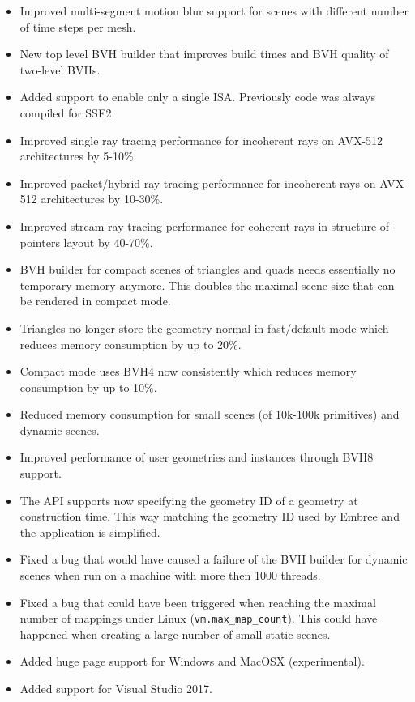 \begin{itemize}
\tightlist
\item
  Improved multi-segment motion blur support for scenes with different
  number of time steps per mesh.
\item
  New top level BVH builder that improves build times and BVH quality of
  two-level BVHs.
\item
  Added support to enable only a single ISA. Previously code was always
  compiled for SSE2.
\item
  Improved single ray tracing performance for incoherent rays on AVX-512
  architectures by 5-10\%.
\item
  Improved packet/hybrid ray tracing performance for incoherent rays on
  AVX-512 architectures by 10-30\%.
\item
  Improved stream ray tracing performance for coherent rays in
  structure-of-pointers layout by 40-70\%.
\item
  BVH builder for compact scenes of triangles and quads needs
  essentially no temporary memory anymore. This doubles the maximal
  scene size that can be rendered in compact mode.
\item
  Triangles no longer store the geometry normal in fast/default mode
  which reduces memory consumption by up to 20\%.
\item
  Compact mode uses BVH4 now consistently which reduces memory
  consumption by up to 10\%.
\item
  Reduced memory consumption for small scenes (of 10k-100k primitives)
  and dynamic scenes.
\item
  Improved performance of user geometries and instances through BVH8
  support.
\item
  The API supports now specifying the geometry ID of a geometry at
  construction time. This way matching the geometry ID used by Embree
  and the application is simplified.
\item
  Fixed a bug that would have caused a failure of the BVH builder for
  dynamic scenes when run on a machine with more then 1000 threads.
\item
  Fixed a bug that could have been triggered when reaching the maximal
  number of mappings under Linux (\texttt{vm.max\_map\_count}). This
  could have happened when creating a large number of small static
  scenes.
\item
  Added huge page support for Windows and MacOSX (experimental).
\item
  Added support for Visual Studio 2017.

\end{itemize}
